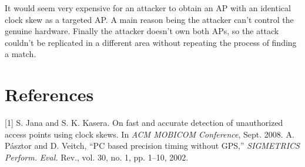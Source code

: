 \documentclass[11pt]{article}
\begin{document}
It would seem very expensive for an attacker to obtain an AP with an identical clock skew as a targeted AP. A main reason being the attacker can't control the genuine hardware. Finally the attacker doesn't own both APs, so the attack couldn't be replicated in a different area without repeating the process of finding a match.


\section*{References}
[1]  S. Jana and S. K. Kasera. On fast and accurate detection of
unauthorized access points using \hspace*{1em} clock skews. In \textit{ACM
MOBICOM Conference}, Sept. 2008.
\newline \newline
[2]  A. Pásztor and D. Veitch, “PC based precision timing without GPS,”
\textit{SIGMETRICS Perform.} \hspace*{1em} \textit{Eval.} Rev., vol. 30, no. 1, pp. 1–10, 2002.
\end{document}
